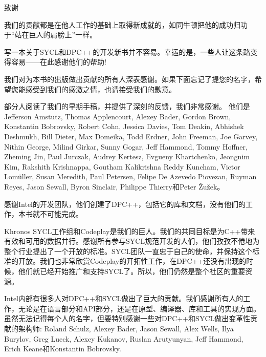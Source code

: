 \begin{flushright}
 致谢
\end{flushright}

我们的贡献都是在他人工作的基础上取得新成就的，如同牛顿把他的成功归功于“站在巨人的肩膀上”一样。\par

写一本关于SYCL和DPC++的开发新书并不容易。幸运的是，一些人让这条路变得容易——在此感谢他们的帮助!\par

我们对为本书的出版做出贡献的所有人深表感谢。如果下面忘记了提您的名字，希望您能感受到我们的感激之情，也请接受我们的歉意。\par

部分人阅读了我们的早期手稿，并提供了深刻的反馈，我们非常感谢。 他们是Jefferson Amstutz, Thomas Applencourt, Alexey Bader, Gordon Brown, Konstantin Bobrovsky, Robert Cohn, Jessica Davies, Tom Deakin, Abhishek Deshmukh, Bill Dieter, Max Domeika, Todd Erdner, John Freeman, Joe Garvey, Nithin George, Milind Girkar, Sunny Gogar, Jeff Hammond, Tommy Hoffner, Zheming Jin, Paul Jurczak, Audrey Kertesz, Evgueny Khartchenko, Jeongnim Kim, Rakshith Krishnappa, Goutham Kalikrishna Reddy Kuncham, Victor Lomüller, Susan Meredith, Paul Petersen, Felipe De Azevedo Piovezan, Ruyman Reyes, Jason Sewall, Byron Sinclair, Philippe Thierry和Peter Žužek。 \par

感谢Intel的开发团队，他们创建了DPC++，包括它的库和文档，没有他们的工作，本书就不可能完成。\par

Khronos SYCL工作组和Codeplay是我们的巨人。我们的共同目标是为C++带来有效和可用的数据并行。感谢所有参与SYCL规范开发的人们，他们孜孜不倦地为整个行业提出了一个开放的标准。SYCL团队一直忠于自己的使命，并保持这个标准的开放。我们也非常欣赏Codeplay的开拓性工作，在DPC++还没有出现的时候，他们就已经开始推广和支持SYCL了。所以，他们仍然是整个社区的重要资源。\par

Intel内部有很多人对DPC++和SYCL做出了巨大的贡献。我们感谢所有人的工作，无论是在语言部分和API部分，还是在原型、编译器、库和工具的实现方面。虽然无法记得每个人的名字，但要特别感谢一些对DPC++和SYCL做出变革性贡献的架构师: Roland Schulz, Alexey Bader, Jason Sewall, Alex Wells, Ilya Burylov, Greg Lueck, Alexey Kukanov, Ruslan Arutyunyan, Jeff Hammond, Erich Keane和Konstantin Bobrovsky.\par


